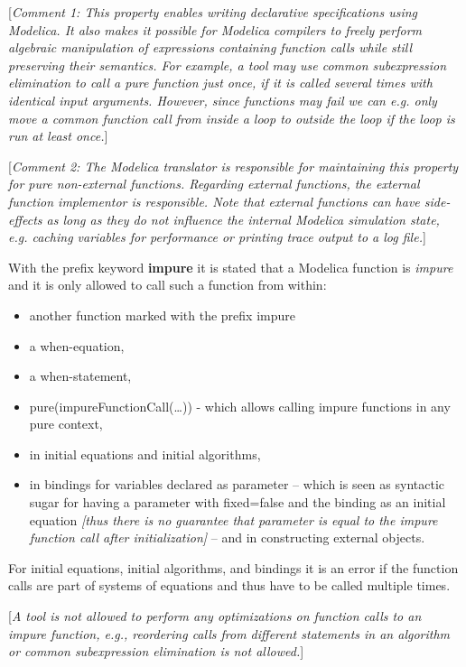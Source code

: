 {[}\emph{Comment 1: This property enables writing declarative
specifications using Modelica. It also makes it possible for Modelica
compilers to freely perform algebraic manipulation of expressions
containing function calls while still preserving their semantics. For
example, a tool may use common subexpression elimination to call a pure
function just once, if it is called several times with identical input
arguments. However, since functions may fail we can e.g. only move a
common function call from inside a loop to outside the loop if the loop
is run at least once.}{]}

{[}\emph{Comment 2: The Modelica translator is responsible for
maintaining this property for pure non-external functions. Regarding
external functions, the external function implementor is responsible.
Note that external functions can have side-effects as long as they do
not influence the internal Modelica simulation state, e.g. caching
variables for performance or printing trace output to a log file.}{]}

With the prefix keyword \textbf{impure} it is stated that a Modelica
function is \emph{impure} and it is only allowed to call such a function
from within:

\begin{itemize}
\item
  another function marked with the prefix impure
\item
  a when-equation,
\item
  a when-statement,
\item
  pure(impureFunctionCall(\ldots{})) - which allows calling impure
  functions in any pure context,
\item
  in initial equations and initial algorithms,
\item
  in bindings for variables declared as parameter -- which is seen as
  syntactic sugar for having a parameter with fixed=false and the
  binding as an initial equation \emph{{[}thus there is no guarantee
  that parameter is equal to the impure function call after
  initialization{]}} -- and in constructing external objects.
\end{itemize}

For initial equations, initial algorithms, and bindings it is an error
if the function calls are part of systems of equations and thus have to
be called multiple times.

{[}\emph{A tool is not allowed to perform any optimizations on function
calls to an impure function, e.g., reordering calls from different
statements in an algorithm or common subexpression elimination is not
allowed.}{]}

